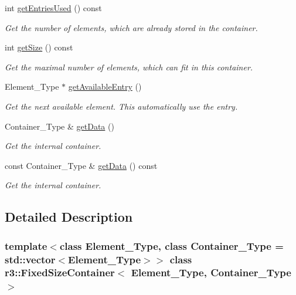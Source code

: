 \begin{DoxyCompactItemize}
int \mbox{\hyperlink{classr3_1_1_fixed_size_container_a4ec349530e78e78244f739139ed58b49}{get\+Entries\+Used}} () const
\begin{DoxyCompactList}\small\item\em Get the number of elements, which are already stored in the container. \end{DoxyCompactList}\item 
int \mbox{\hyperlink{classr3_1_1_fixed_size_container_a984b90ac15df32a41011e665e3059e17}{get\+Size}} () const
\begin{DoxyCompactList}\small\item\em Get the maximal number of elements, which can fit in this container. \end{DoxyCompactList}\item 
Element\+\_\+\+Type $\ast$ \mbox{\hyperlink{classr3_1_1_fixed_size_container_a7903fc6d43600195b97218aead60a99a}{get\+Available\+Entry}} ()
\begin{DoxyCompactList}\small\item\em Get the next available element. This automatically use the entry. \end{DoxyCompactList}\item 
Container\+\_\+\+Type \& \mbox{\hyperlink{classr3_1_1_fixed_size_container_adbf383734c597677d4221278000886a3}{get\+Data}} ()
\begin{DoxyCompactList}\small\item\em Get the internal container. \end{DoxyCompactList}\item 
const Container\+\_\+\+Type \& \mbox{\hyperlink{classr3_1_1_fixed_size_container_acd837bc4730c98aa4346819726620842}{get\+Data}} () const
\begin{DoxyCompactList}\small\item\em Get the internal container. \end{DoxyCompactList}\end{DoxyCompactItemize}


\subsection{Detailed Description}
\subsubsection*{template$<$class Element\+\_\+\+Type, class Container\+\_\+\+Type = std\+::vector$<$\+Element\+\_\+\+Type$>$$>$\newline
class r3\+::\+Fixed\+Size\+Container$<$ Element\+\_\+\+Type, Container\+\_\+\+Type $>$}

